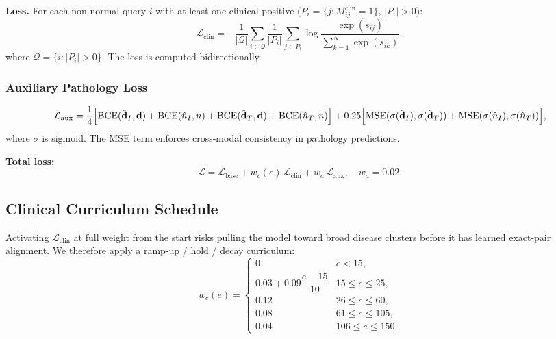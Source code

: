 \documentclass[11pt, a4paper]{article}
\newcommand{\calL}{\mathcal{L}}
\newcommand{\calQ}{\mathcal{Q}}
\newcommand{\vv}[1]{\mathbf{#1}}
\begin{document}
\textbf{Loss.} For each non-normal query $i$ with at least one clinical
positive ($P_i=\{j:M^{\mathrm{clin}}_{ij}=1\}$, $|P_i|>0$):
\begin{equation}
  \calL_{\mathrm{clin}} =
    -\frac{1}{|\calQ|}\sum_{i\in\calQ}\frac{1}{|P_i|}
    \sum_{j\in P_i}\log\frac{\exp(s_{ij})}{\sum_{k=1}^{N}\exp(s_{ik})},
  \label{eq:clinloss}
\end{equation}
where $\calQ=\{i:|P_i|>0\}$.
The loss is computed bidirectionally.

\subsubsection{Auxiliary Pathology Loss}

\begin{equation}
  \calL_{\mathrm{aux}} =
    \frac{1}{4}\Bigl[
      \mathrm{BCE}(\hat{\vv{d}}_I,\vv{d})
      +\mathrm{BCE}(\hat{n}_I,n)
      +\mathrm{BCE}(\hat{\vv{d}}_T,\vv{d})
      +\mathrm{BCE}(\hat{n}_T,n)
    \Bigr]
    + 0.25\Bigl[
      \mathrm{MSE}(\sigma(\hat{\vv{d}}_I),\sigma(\hat{\vv{d}}_T))
      +\mathrm{MSE}(\sigma(\hat{n}_I),\sigma(\hat{n}_T))
    \Bigr],
  \label{eq:auxloss}
\end{equation}
where $\sigma$ is sigmoid.
The MSE term enforces cross-modal consistency in pathology predictions.

\textbf{Total loss:}
\begin{equation}
  \calL = \calL_{\mathrm{base}} + w_c(e)\,\calL_{\mathrm{clin}}
          + w_a\,\calL_{\mathrm{aux}},
  \quad w_a = 0.02.
  \label{eq:totalloss}
\end{equation}

\subsection{Clinical Curriculum Schedule}
\label{sec:curriculum}

Activating $\calL_{\mathrm{clin}}$ at full weight from the start risks
pulling the model toward broad disease clusters before it has learned
exact-pair alignment.
We therefore apply a ramp-up / hold / decay curriculum:
\begin{equation}
  w_c(e) =
  \begin{cases}
    0 & e < 15, \\[3pt]
    0.03 + 0.09\dfrac{e-15}{10} & 15 \leq e \leq 25, \\[6pt]
    0.12 & 26 \leq e \leq 60, \\[3pt]
    0.08 & 61 \leq e \leq 105, \\[3pt]
    0.04 & 106 \leq e \leq 150.
  \end{cases}
  \label{eq:curriculum}
\end{equation}
\end{document}

